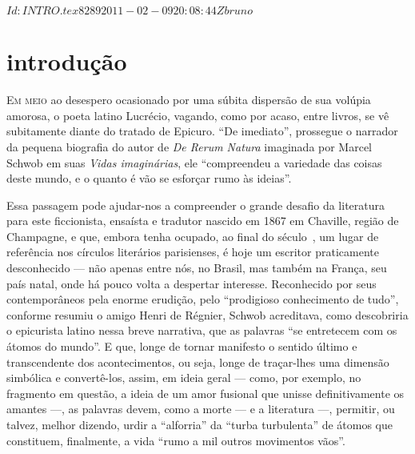 \SVN $Id: INTRO.tex 8289 2011-02-09 20:08:44Z bruno $
\chapter[Introdução, por Marcelo Jacques de Moraes ]{introdução}


\textsc{Em meio} ao desespero ocasionado por uma súbita dispersão de sua volúpia amorosa,
o poeta latino Lucrécio, vagando, como por acaso, entre livros, se vê
subitamente diante do tratado de Epicuro. “De imediato”, prossegue o narrador
da pequena biografia do autor de \textit{De Rerum Natura} imaginada por Marcel
Schwob em suas \textit{Vidas imaginárias}, ele “compreendeu a variedade das
coisas deste mundo, e o quanto é vão se esforçar rumo às ideias”. 

Essa passagem pode ajudar-nos a compreender o grande desafio da literatura para
este ficcionista, ensaísta e tradutor nascido em 1867 em Chaville, região de
Champagne, e que, embora tenha ocupado, ao final do século~, um lugar de
referência nos círculos literários parisienses, é hoje um escritor praticamente
desconhecido --- não apenas entre nós, no Brasil, mas também na França, seu país
natal, onde há pouco volta a despertar interesse. Reconhecido por seus
contemporâneos pela enorme erudição, pelo “prodigioso conhecimento de tudo”,
conforme resumiu o amigo Henri de Régnier, Schwob
acreditava, como descobriria o epicurista latino nessa breve narrativa, que as
palavras “se entretecem com os átomos do mundo”. E que, longe de
tornar manifesto o sentido último e transcendente dos acontecimentos, ou seja,
longe de traçar-lhes uma dimensão simbólica e convertê-los, assim, em ideia
geral --- como, por exemplo, no fragmento em questão, a ideia de um amor fusional
que unisse definitivamente os amantes ---, as palavras devem, como a morte --- e a
literatura ---, permitir, ou talvez, melhor dizendo, urdir a “alforria” da “turba
turbulenta” de átomos que constituem, finalmente, a vida “rumo a mil outros
movimentos vãos”. 

